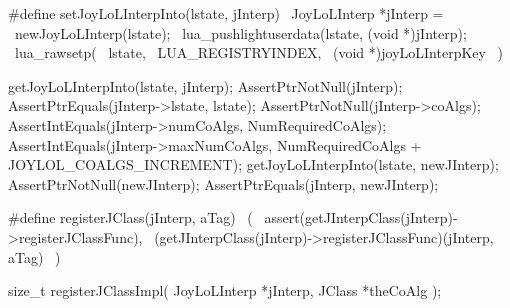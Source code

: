 \startCHeader
#define setJoyLoLInterpInto(lstate, jInterp)      \
  JoyLoLInterp *jInterp =                         \
    newJoyLoLInterp(lstate);                      \
  lua_pushlightuserdata(lstate, (void *)jInterp); \
  lua_rawsetp(                                    \
    lstate,                                       \
    LUA_REGISTRYINDEX,                            \
    (void *)joyLoLInterpKey                       \
  )
\stopCHeader
\setCHeaderStream{public}


\startCTest
  getJoyLoLInterpInto(lstate, jInterp);
  AssertPtrNotNull(jInterp);
  AssertPtrEquals(jInterp->lstate, lstate);
  AssertPtrNotNull(jInterp->coAlgs);
  AssertIntEquals(jInterp->numCoAlgs, NumRequiredCoAlgs);
  AssertIntEquals(jInterp->maxNumCoAlgs,
    NumRequiredCoAlgs + JOYLOL_COALGS_INCREMENT);
  getJoyLoLInterpInto(lstate, newJInterp);
  AssertPtrNotNull(newJInterp);
  AssertPtrEquals(jInterp, newJInterp);
\stopCTest
\stopTestCase
\stopTestSuite

\startTestSuite[registerCoAlgebra]

\startCHeader
#define registerJClass(jInterp, aTag)                              \
  (                                                                    \
    assert(getJInterpClass(jInterp)->registerJClassFunc),          \
    (getJInterpClass(jInterp)->registerJClassFunc)(jInterp, aTag)  \
  )
\stopCHeader

\startCHeader
size_t registerJClassImpl(
  JoyLoLInterp *jInterp,
  JClass *theCoAlg
);
\stopCHeader
\setCHeaderStream{public}

